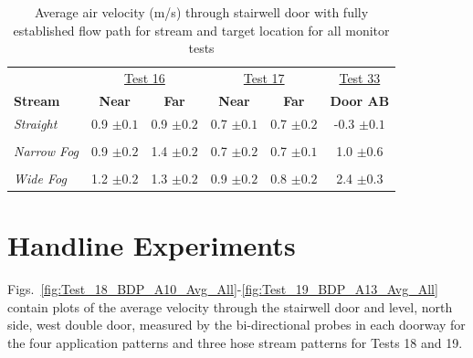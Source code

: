 \documentclass[12pt,oneside]{book}
\begin{document}

\begin{table}[!ht]
\caption{Average air velocity (m/s) through stairwell door with fully established flow path for stream and target location for all monitor tests}
\begin{tabular}{lccccc}
\toprule
 & \multicolumn{2}{c}{\underline{Test 16}} & \multicolumn{2}{c}{\underline{Test 17}} & \underline{Test 33}
\\
\textbf{Stream} & \textbf{Near} & \textbf{Far} & \textbf{Near} & \textbf{Far} & \textbf{Door AB}
\\ \midrule
\textit{Straight} & 0.9 $\pm0.1$ & 0.9 $\pm0.2$ & 0.7 $\pm0.1$ & 0.7 $\pm0.2$ & -0.3 $\pm0.1$
\\ \multicolumn{6}{c}{} \\
\textit{Narrow Fog} & 0.9 $\pm0.2$ & 1.4 $\pm0.2$ & 0.7 $\pm0.2$ & 0.7 $\pm0.1$ & 1.0 $\pm0.6$
\\ \multicolumn{6}{c}{} \\
\textit{Wide Fog} & 1.2 $\pm0.2$ & 1.3 $\pm0.2$ & 0.9 $\pm0.2$ & 0.8 $\pm0.2$ & 2.4 $\pm0.3$
\\ \bottomrule
\end{tabular}
\label{table:all_mon_vel_avgs}
\end{table}

\section{Handline Experiments}
\label{sec:handline_results}

Figs.~\ref{fig:Test_18_BDP_A10_Avg_All}-\ref{fig:Test_19_BDP_A13_Avg_All} contain plots of the average velocity through the stairwell door and  level, north side, west double door, measured by the bi-directional probes in each doorway for the four application patterns and three hose stream patterns for Tests 18 and 19. 



\end{document}

